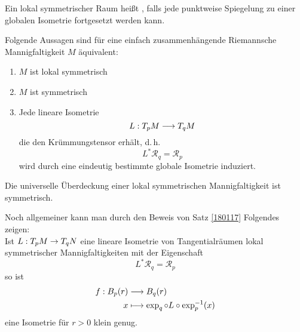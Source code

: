 \documentclass{book}
\newcommand{\Rc}{\mathcal{R}}
\begin{document}
\Def{}
Ein lokal symmetrischer Raum heißt , falls jede punktweise Spiegelung zu einer globalen Isometrie fortgesetzt werden kann.

\Satz{}
Folgende Aussagen sind für eine einfach zusammenhängende Riemannsche Mannigfaltigkeit $M$ äquivalent:
\begin{enumerate}[1.)]
\item $M$ ist lokal symmetrisch
\item $M$ ist symmetrisch
\item Jede lineare Isometrie
\[L : T_pM \overset{}{\longrightarrow} T_qM \]
die den Krümmungstensor erhält, d.\,h.
\[ L^*\Rc_q = \Rc_p \]
wird durch eine eindeutig bestimmte globale Isometrie induziert.
\end{enumerate}

\Kor{}
Die universelle Überdeckung einer lokal symmetrischen Mannigfaltigkeit ist symmetrisch.

\Bem{}
Noch allgemeiner kann man durch den Beweis von Satz \ref{180117} Folgendes zeigen:\\
Ist $L : T_pM \overset{}{\rightarrow} T_q N$ eine lineare Isometrie von Tangentialräumen lokal symmetrischer Mannigfaltigkeiten mit der Eigenschaft
\[ L^*\Rc_q =\Rc_p \]
so ist
\begin{align*}
f : B_p(r) & \overset{}{\longrightarrow} B_q(r)\\
x & \longmapsto \exp_q \circ L \circ \exp_p^{-1}(x)
\end{align*}
eine Isometrie für $r > 0$ klein genug.
\end{document}
